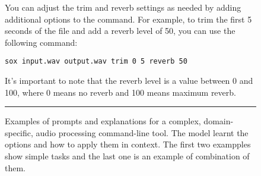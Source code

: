 \documentclass[10pt]{article}
\begin{document}
\begin{figure}
You can adjust the trim and reverb settings as needed by adding additional options to the command. For example, to trim the first 5 seconds of the file and add a reverb level of 50, you can use the following command:
\begin{verbatim}
sox input.wav output.wav trim 0 5 reverb 50
\end{verbatim}
It's important to note that the reverb level is a value between 0 and 100, where 0 means no reverb and 100 means maximum reverb.\\
\noindent\rule{\textwidth}{1pt}
    \caption{Examples of prompts and explanations for a complex, domain-specific, audio processing command-line tool. The model learnt the options and how to apply them in context. The first two exampples show simple tasks and the last one is an example of combination of them.}
    \label{fig:sox_examples}
\end{figure}
\end{document}
